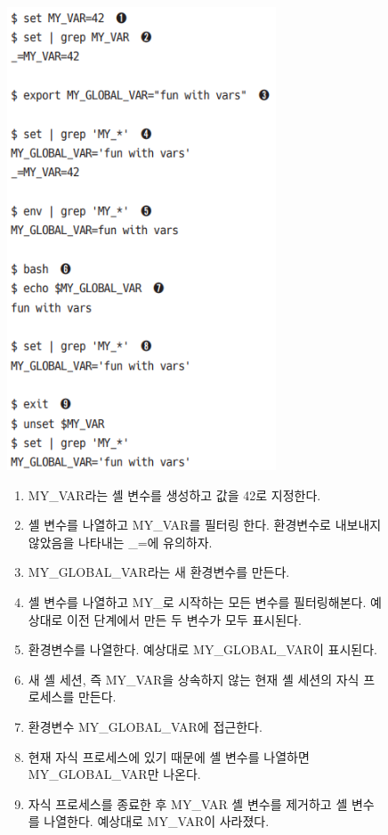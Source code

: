 \begin{figure}[h]
    \includegraphics[width=8cm]{resource/3-variable.png}
    \begin{enumerate}
        \item MY\_VAR라는 셸 변수를 생성하고 값을 42로 지정한다.
        \item 셸 변수를 나열하고 MY\_VAR를 필터링 한다.
            환경변수로 내보내지 않았음을 나타내는 \_=에 유의하자.
        \item MY\_GLOBAL\_VAR라는 새 환경변수를 만든다.
        \item 셸 변수를 나열하고 MY\_로 시작하는 모든 변수를 필터링해본다.
            예상대로 이전 단계에서 만든 두 변수가 모두 표시된다.
        \item 환경변수를 나열한다. 예상대로 MY\_GLOBAL\_VAR이 표시된다.
        \item 새 셸 세션,
            즉 MY\_VAR을 상속하지 않는 현재 셸 세션의 자식 프로세스를 만든다.
        \item 환경변수 MY\_GLOBAL\_VAR에 접근한다.
        \item 현재 자식 프로세스에 있기 때문에 셸 변수를 나열하면
            MY\_GLOBAL\_VAR만 나온다.
        \item 자식 프로세스를 종료한 후 MY\_VAR 셸 변수를 제거하고 셸 변수를 나열한다.
            예상대로 MY\_VAR이 사라졌다.
    \end{enumerate}
\end{figure}

